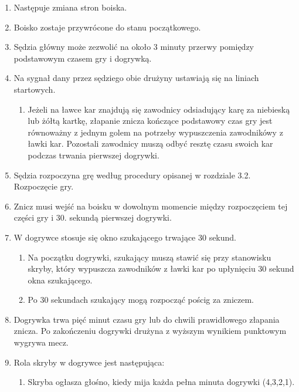 \documentclass[12pt]{article}
\begin{document}
\begin{enumerate}
	\item Następuje zmiana stron boiska.

	\item Boisko zostaje przywrócone do stanu początkowego.

	\item Sędzia główny może zezwolić na około 3 minuty przerwy pomiędzy
	      podstawowym czasem gry i dogrywką.

	\item Na sygnał dany przez sędziego obie drużyny ustawiają się na liniach
	      startowych.
	      \begin{enumerate}
		      \item Jeżeli na ławce kar znajdują się zawodnicy odsiadujący karę za
		            niebieską lub żółtą kartkę, złapanie znicza kończące podstawowy czas gry
		            jest równoważny z jednym golem na potrzeby wypuszczenia zawodnikówy z
		            ławki kar. Pozostali zawodnicy muszą odbyć resztę czasu swoich kar
		            podczas trwania pierwszej dogrywki.
	      \end{enumerate}

	\item Sędzia rozpoczyna grę według procedury opisanej w rozdziale 3.2.
	      Rozpoczęcie gry.

	\item Znicz musi wejść na boisku w dowolnym momencie między rozpoczęciem
	      tej części gry i 30. sekundą pierwszej dogrywki.

	\item W dogrywce stosuje się okno szukającego trwające 30 sekund.
	      \begin{enumerate}
		      \item Na początku dogrywki, szukający muszą stawić się przy stanowisku
		            skryby, który wypuszcza zawodników z ławki kar po upłynięciu 30 sekund
		            okna szukającego.

		      \item Po 30 sekundach szukający mogą rozpocząć pościg za zniczem.
	      \end{enumerate}

	\item Dogrywka trwa pięć minut czasu gry lub do chwili prawidłowego
	      złapania znicza. Po zakończeniu dogrywki drużyna z wyższym wynikiem
	      punktowym wygrywa mecz.

	\item Rola skryby w dogrywce jest następująca:
	      \begin{enumerate}
		      \item  Skryba ogłasza głośno, kiedy mija każda pełna minuta dogrywki
		            (4,3,2,1).


\end{enumerate}
\end{enumerate}
\end{document}
